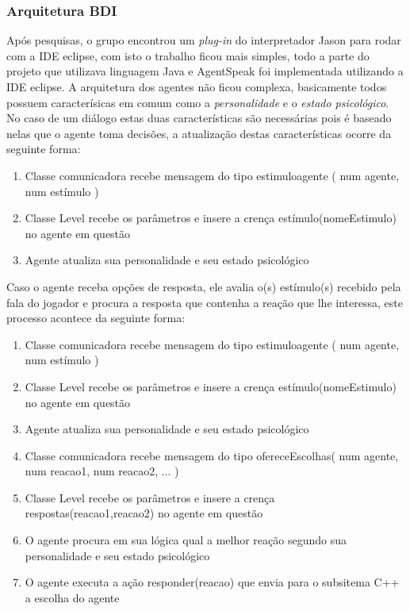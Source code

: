 \subsubsection{Arquitetura BDI}
Após pesquisas, o grupo encontrou um \emph{plug-in} do interpretador Jason para rodar com a IDE eclipse, com isto o trabalho ficou mais simples, todo a parte do projeto que utilizava linguagem Java e AgentSpeak foi implementada utilizando a IDE eclipse.
A arquitetura dos agentes não ficou complexa, basicamente todos possuem caracterísicas em comum como a \emph{personalidade} e o \emph{estado psicológico}. No caso de um diálogo estas duas características são necessárias pois é baseado nelas que o agente toma decisões, a atualização destas características ocorre da seguinte forma:
\begin{enumerate} 
\item Classe comunicadora recebe mensagem do tipo estimuloagente ( num agente, num estímulo )
\item Classe Level recebe os parâmetros e insere a crença estímulo(nomeEstimulo) no agente em questão
\item Agente atualiza sua personalidade e seu estado psicológico
\end{enumerate}

Caso o agente receba opções de resposta, ele avalia o(s) estímulo(s) recebido pela fala do jogador e procura a resposta que contenha a reação que lhe interessa, este processo acontece da seguinte forma:

\begin{enumerate} 
\item Classe comunicadora recebe mensagem do tipo estimuloagente ( num agente, num estímulo )
\item Classe Level recebe os parâmetros e insere a crença estímulo(nomeEstimulo) no agente em questão
\item Agente atualiza sua personalidade e seu estado psicológico
\item Classe comunicadora recebe mensagem do tipo ofereceEscolhas( num agente, num reacao1, num reacao2, ... )
\item Classe Level recebe os parâmetros e insere a crença respostas(reacao1,reacao2) no agente em questão
\item O agente procura em sua lógica qual a melhor reação segundo sua personalidade e seu estado psicológico 
\item O agente executa a ação responder(reacao) que envia para o subsitema C++ a escolha do agente
\end{enumerate}

